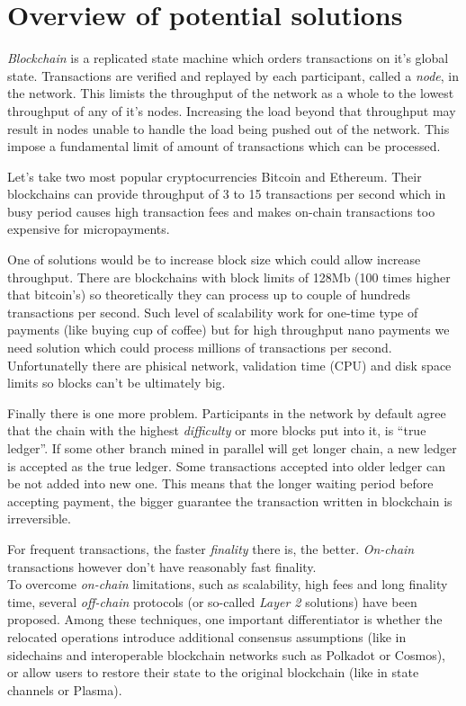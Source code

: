 \documentclass[a4paper,12pt]{article}
\begin{document}
\section{Overview of potential solutions}

\textit{Blockchain} is a replicated state machine which orders transactions on 
it's global state. Transactions are verified and replayed by each participant,
called a \textit{node}, in the network. This limists the throughput of the 
network as a whole to the lowest throughput of any of it's nodes. Increasing 
the load beyond that throughput may result in nodes unable to handle the load 
being pushed out of the network. This impose a fundamental limit of amount of 
transactions which can be processed. 

Let's take two most popular cryptocurrencies Bitcoin and Ethereum. Their 
blockchains can provide throughput of 3 to 15 transactions per second which in 
busy period causes high transaction fees and makes on-chain transactions too 
expensive for micropayments.

One of solutions would be to increase block size which could allow increase 
throughput. There are blockchains with block limits of 128Mb (100 times higher 
that bitcoin's) so theoretically they can process up to couple of hundreds 
transactions per second. Such level of scalability work for one-time type of 
payments (like buying cup of coffee) but for high throughput nano payments we 
need solution which could process millions of transactions per second. 
Unfortunatelly there are phisical network, validation time (CPU) and disk space 
limits so blocks can't be ultimately big.

Finally there is one more problem. Participants in the network by default agree 
that the chain with the highest \textit{difficulty} or more blocks put into it, 
is “true ledger”. If some other branch mined in parallel will get longer chain, 
a new ledger is accepted as the true ledger. Some transactions accepted into 
older ledger can be not added into new one. This means that the longer waiting 
period before accepting payment, the bigger guarantee the transaction written 
in blockchain is irreversible.

For frequent transactions, the faster \textit{finality} there is, the better. 
\textit{On-chain} transactions however don't have reasonably fast finality.\\

To overcome \textit{on-chain} limitations, such as scalability, high fees and
long finality time, several \textit{off-chain} protocols (or so-called 
\textit{Layer 2} solutions) have been proposed. Among these techniques, one 
important differentiator is whether the relocated operations introduce 
additional consensus assumptions (like in sidechains and interoperable 
blockchain networks such as Polkadot or Cosmos), or allow users to restore their
state to the original blockchain (like in state channels or Plasma).
\end{document}
